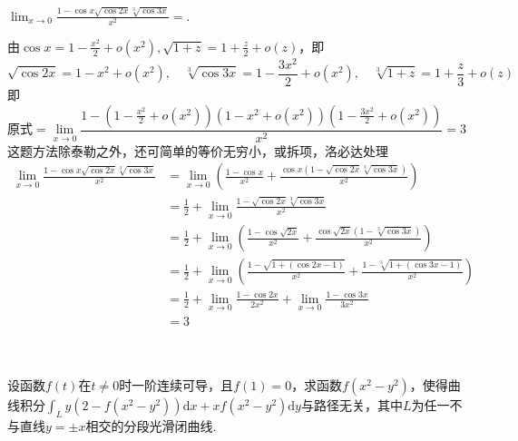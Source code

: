 \documentclass[hideanswer=false,
	enfont=newtxtext,
	zhfont=empty,
	mathfont=newtxmath,
]{cmcthesis}
\begin{document}
\wq $\lim_{x\rightarrow 0}\frac{1-\cos x\sqrt{\cos 2x}\sqrt[3]{\cos 3x}}{x^2}=$\underline{\hspace{3em}}.\\
	\begin{answer}
	\begin{solution}
	由$\cos x= 1-\frac{x^2}{2}+o(x^2),\sqrt{1+z}=1+\frac{z}{2}+o(z)$，即
	\[\sqrt{\cos 2x}= 1-x^2+o(x^2),\quad \sqrt[3]{\cos 3x}= 1-\frac{3x^2}{2}+o(x^2),\quad \sqrt[3]{1+z}=1+\frac{z}{3}+o(z)\]
即
	\[
	\text{原式}=\lim_{x\rightarrow 0}\frac{1-\left(1-\frac{x^2}{2}+o\left(x^2\right)\right)\left(1-x^2+o\left(x^2\right)\right)\left(1-\frac{3x^2}{2}+o\left(x^2\right)\right)}{x^2}=3
	\]
这题方法除泰勒之外，还可简单的等价无穷小，或拆项，洛必达处理
\begin{align*}
	\lim_{x\rightarrow 0}\frac{1-\cos x\sqrt{\cos 2x}\sqrt[3]{\cos 3x}}{x^2}&=\lim_{x\rightarrow 0}\left(\frac{1-\cos x}{x^2}+\frac{\cos x\left(1-\sqrt{\cos 2x}\sqrt[3]{\cos 3x}\right)}{x^2}\right)\\
	&=\frac{1}{2}+\lim_{x\rightarrow 0}\frac{1-\sqrt{\cos 2x}\sqrt[3]{\cos 3x}}{x^2}\\
	&=\frac{1}{2}+\lim_{x\rightarrow 0}\left(\frac{1-\cos\sqrt{2x}}{x^2}+\frac{\cos\sqrt{2x}\left(1-\sqrt[3]{\cos 3x}\right)}{x^2}\right)\\
	&=\frac{1}{2}+\lim_{x\rightarrow 0}\left(\frac{1-\sqrt{1+\left(\cos 2x-1\right)}}{x^2}+\frac{1-\sqrt[3]{1+\left(\cos 3x-1\right)}}{x^2}\right)\\
	&=\frac{1}{2}+\lim_{x\rightarrow 0}\frac{1-\cos 2x}{2x^2}+\lim_{x\rightarrow 0}\frac{1-\cos 3x}{3x^2}\\
	&=3
\end{align*}
	\end{solution}
	\end{answer}
\\\\
设函数$f(t)$在$t\ne 0$时一阶连续可导，且$f(1)=0$，求函数$f(x^2-y^2)$，使得曲线积分$\displaystyle \int_L{y\left(2-f\left(x^2-y^2\right)\right)}\mathrm {d}x+xf\left(x^2-y^2\right)\mathrm{d}y
$与路径无关，其中$L$为任一不与直线$y=\pm x$相交的分段光滑闭曲线.
\end{document}
